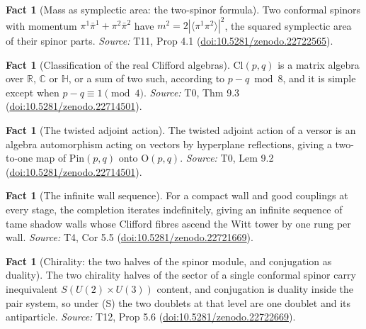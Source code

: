 \documentclass[11pt]{article}
\theoremstyle{definition}
\newtheorem{fact}[theorem]{Fact}
\theoremstyle{plain}
\providecommand{\C}{}\renewcommand{\C}{\mathbb{C}}
\providecommand{\Cl}{}\renewcommand{\Cl}{\mathrm{Cl}}
\providecommand{\HH}{}\renewcommand{\HH}{\mathbb{H}}
\providecommand{\Pin}{}\renewcommand{\Pin}{\mathrm{Pin}}
\providecommand{\R}{}\renewcommand{\R}{\mathbb{R}}
\providecommand{\br}{}\renewcommand{\br}[1]{\langle #1\rangle}
\begin{document}
\begin{fact}[Mass as symplectic area: the two-spinor formula]\label{c:mass.mass-symplectic-area-two-twistor-formula}
Two conformal spinors with momentum $\pi^{1}\bar\pi^{1} + \pi^{2}\bar\pi^{2}$ have $m^{2} = 2|\br{\pi^{1}\pi^{2}}|^{2}$, the squared symplectic area of their spinor parts.
\emph{Source:} T11, Prop 4.1 (\href{https://doi.org/10.5281/zenodo.22722565}{doi:10.5281/zenodo.22722565}).
\end{fact}

\begin{fact}[Classification of the real Clifford algebras]\label{c:primer.classification-real-clifford-algebras}
$\Cl(p,q)$ is a matrix algebra over $\R$, $\C$ or $\HH$, or a sum of two such, according to $p - q \bmod 8$, and it is simple except when $p - q \equiv 1 \pmod 4$.
\emph{Source:} T0, Thm 9.3 (\href{https://doi.org/10.5281/zenodo.22714501}{doi:10.5281/zenodo.22714501}).
\end{fact}

\begin{fact}[The twisted adjoint action]\label{c:primer.twisted-adjoint-action}
The twisted adjoint action of a versor is an algebra automorphism acting on vectors by hyperplane reflections, giving a two-to-one map of $\Pin(p,q)$ onto $\mathrm{O}(p,q)$.
\emph{Source:} T0, Lem 9.2 (\href{https://doi.org/10.5281/zenodo.22714501}{doi:10.5281/zenodo.22714501}).
\end{fact}

\begin{fact}[The infinite wall sequence]\label{c:sheaf.infinite-wall-sequence}
For a compact wall and good couplings at every stage, the completion iterates indefinitely, giving an infinite sequence of tame shadow walls whose Clifford fibres ascend the Witt tower by one rung per wall.
\emph{Source:} T4, Cor 5.5 (\href{https://doi.org/10.5281/zenodo.22721669}{doi:10.5281/zenodo.22721669}).
\end{fact}

\begin{fact}[Chirality: the two halves of the spinor module, and conjugation as duality]\label{c:standard-model.chirality-two-halves-spinor-module-conjugation}
The two chirality halves of the sector of a single conformal spinor carry inequivalent $S(U(2) \times U(3))$ content, and conjugation is duality inside the pair system, so under (S) the two doublets at that level are one doublet and its antiparticle.
\emph{Source:} T12, Prop 5.6 (\href{https://doi.org/10.5281/zenodo.22722669}{doi:10.5281/zenodo.22722669}).
\end{fact}
\end{document}
